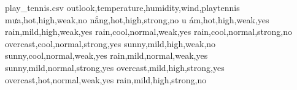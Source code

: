 \begin{filecontents*}{play_tennis.csv}
outlook,temperature,humidity,wind,playtennis
mưa,hot,high,weak,no
nắng,hot,high,strong,no
u ám,hot,high,weak,yes
rain,mild,high,weak,yes
rain,cool,normal,weak,yes
rain,cool,normal,strong,no
overcast,cool,normal,strong,yes
sunny,mild,high,weak,no
sunny,cool,normal,weak,yes
rain,mild,normal,weak,yes
sunny,mild,normal,strong,yes
overcast,mild,high,strong,yes
overcast,hot,normal,weak,yes
rain,mild,high,strong,no
\end{filecontents*}
